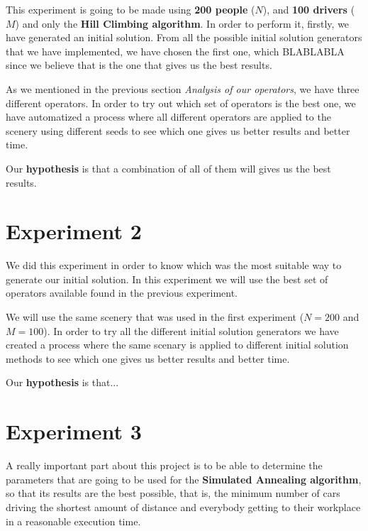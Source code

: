 \documentclass[12]{article}
\begin{document}
This experiment is going to be made using \textbf{200 people }($N$), and \textbf{100 drivers }($M$) and only the \textbf{Hill Climbing algorithm}. In order to perform it, firstly, we have generated an initial solution. From all the possible initial solution generators that we have implemented, we have chosen the first one, which BLABLABLA since we believe that is the one that gives us the best results. 

As we mentioned in the previous section \textit{Analysis of our operators}, we have three different operators. In order to try out which set of operators is the best one, we have automatized a process where all different operators are applied to the scenery using different seeds to see which one gives us better results and better time. 

Our \textbf{hypothesis} is that a combination of all of them will gives us the best results. 

 
\section{Experiment 2}
We did this experiment in order to know which was the most suitable way to generate our initial solution. In this experiment we will use the best set of operators available found in the previous experiment.

We will use the same scenery that was used in the first experiment ($N=200$ and $M=100$).  In order to try all the different initial solution generators we have created a process where the same scenary is applied to different initial solution methods to see which one gives us better results and better time. 

Our \textbf{hypothesis} is that...


\section{Experiment 3}

A really important part about this project is to be able to determine the parameters that are going to be used for the \textbf{Simulated Annealing algorithm}, so that its results are the best possible, that is, the minimum number of cars driving the shortest amount of distance and everybody getting to their workplace in a reasonable execution time. 
\\
\medskip
\end{document}
